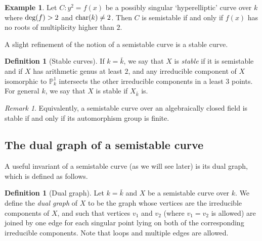 \documentclass[12pt]{amsart}
\numberwithin{equation}{section}
\theoremstyle{remark}
\newtheorem{remark}[equation]{Remark}
\theoremstyle{definition}
\newtheorem{example}[equation]{Example}
\theoremstyle{definition}
\theoremstyle{definition}
\newtheorem{defi}[equation]{Definition}
\theoremstyle{definition}
\theoremstyle{definition}
\theoremstyle{definition}
\begin{document}
\begin{example}
Let $C:y^2=f(x)$ be a possibly singular `hyperelliptic' curve over $k$ where $\textup{deg}(f)>2$ and $\textup{char}(k)\neq 2$. Then $C$ is semistable if and only if $f(x)$ has no roots of multiplicity higher than $2$.
\end{example}

A slight refinement of the notion of a semistable curve is a stable curve. 

\begin{defi}[Stable curves]
If $k=\bar{k}$, we say that $X$ is \textit{stable} if it is semistable and if $X$ has arithmetic genus at least $2$, and any irreducible component of $X$ isomorphic to $\mathbb{P}^1_k$ intersects the other irreducible components in a least $3$ points. For general $k$, we say that $X$ is stable if $X_{\bar{k}}$ is.
\end{defi}

%

\begin{remark} 
Equivalently, a semistable curve over an algebraically closed field is stable if and only if its automorphism group is finite.
\end{remark}

\subsection{The dual graph of a semistable curve}

A useful invariant of a semistable curve (as we will see later) is its dual graph, which is defined as follows.

\begin{defi}[Dual graph]
Let $k=\bar{k}$ and $X$ be a semistable curve over $k$. We define the \textit{dual graph} of $X$ to be the graph whose vertices are the irreducible components of $X$, and such that vertices $v_1$ and $v_2$ (where $v_1=v_2$ is allowed) are joined by one edge for each singular point lying on both of the corresponding irreducible components. Note that loops and multiple edges are allowed.
\end{defi}
\end{document}
